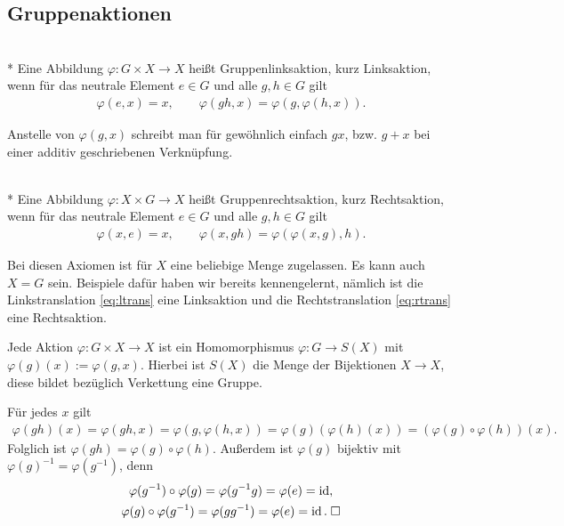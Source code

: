 \subsection{Gruppenaktionen}

\begin{Definition}[Linksaktion]\mbox{}\\*
Eine Abbildung $\varphi\colon G\times X\to X$ heißt Gruppenlinksaktion,
kurz Linksaktion, wenn für das neutrale Element $e\in G$ und alle
$g,h\in G$ gilt
\begin{gather*}
\varphi(e,x) = x,\qquad \varphi(gh,x) = \varphi(g,\varphi(h,x)).
\end{gather*}
\end{Definition}
Anstelle von $\varphi(g,x)$ schreibt man für gewöhnlich einfach $gx$,
bzw. $g+x$ bei einer additiv geschriebenen Verknüpfung.

\begin{Definition}[Rechtsaktion]\mbox{}\\*
Eine Abbildung $\varphi\colon X\times G\to X$ heißt Gruppenrechtsaktion,
kurz Rechtsaktion, wenn für das neutrale Element $e\in G$ und
alle $g,h\in G$ gilt
\begin{gather*}
\varphi(x,e) = x,\qquad \varphi(x,gh) = \varphi(\varphi(x,g),h).
\end{gather*}
\end{Definition}
Bei diesen Axiomen ist für $X$ eine beliebige Menge zugelassen.
Es kann auch $X=G$ sein. Beispiele dafür haben wir bereits
kennengelernt, nämlich ist die Linkstranslation \eqref{eq:ltrans} eine
Linksaktion und die Rechtstranslation \eqref{eq:rtrans} eine
Rechtsaktion.
\begin{Korollar}
Jede Aktion $\varphi\colon G\times X\to X$ ist
ein Homomorphismus $\varphi\colon G\to S(X)$ mit
$\varphi(g)(x):=\varphi(g,x)$. Hierbei ist $S(X)$
die Menge der Bijektionen $X\to X$, diese bildet bezüglich
Verkettung eine Gruppe.
\end{Korollar}
Für jedes $x$ gilt
\begin{align*}
\varphi(gh)(x) = \varphi(gh,x) = \varphi(g,\varphi(h,x))
= \varphi(g)(\varphi(h)(x))
= (\varphi(g)\circ\varphi(h))(x).
\end{align*}
Folglich ist $\varphi(gh)=\varphi(g)\circ\varphi(h)$. Außerdem
ist $\varphi(g)$ bijektiv mit $\varphi(g)^{-1} = \varphi(g^{-1})$, denn
\begin{gather*}
\varphi(g^{-1})\circ\varphi(g) = \varphi(g^{-1}g) = \varphi(e) = \operatorname{id},\\
\varphi(g)\circ \varphi(g^{-1}) = \varphi(gg^{-1}) = \varphi(e) = \operatorname{id}.\;\Box
\end{gather*}

